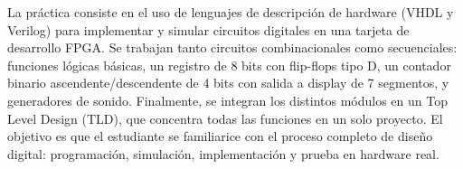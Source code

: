 
La práctica consiste en el uso de lenguajes de descripción de hardware (VHDL y Verilog) para implementar y simular circuitos digitales en una tarjeta de desarrollo FPGA. Se trabajan tanto circuitos combinacionales como secuenciales: funciones lógicas básicas, un registro de 8 bits con flip-flops tipo D, un contador binario ascendente/descendente de 4 bits con salida a display de 7 segmentos, y generadores de sonido. Finalmente, se integran los distintos módulos en un Top Level Design (TLD), que concentra todas las funciones en un solo proyecto. El objetivo es que el estudiante se familiarice con el proceso completo de diseño digital: programación, simulación, implementación y prueba en hardware real.